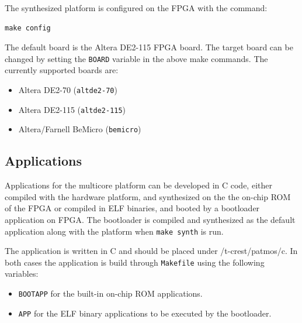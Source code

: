 \documentclass[a4paper,fontsize=10pt,twoside,DIV15,BCOR12mm,headinclude=true,footinclude=false,pagesize,bibtotoc]{scrbook}
\newcommand{\code}[1]{{\texttt{#1}}}
\begin{document}
The synthesized platform is configured on the FPGA with the command:

\begin{verbatim}
make config
\end{verbatim}

The default board is the Altera DE2-115 FPGA board. The target board can be changed by
setting the \code{BOARD} variable in the above make commands. The currently supported boards are:

\begin{itemize}
\item Altera DE2-70 (\code{altde2-70})
\item Altera DE2-115 (\code{altde2-115})
\item Altera/Farnell BeMicro (\code{bemicro})
\end{itemize}


\subsection{Applications}

Applications for the multicore platform can be developed in C code, either 
compiled with the hardware platform, and synthesized on the the on-chip ROM of the FPGA
or compiled in ELF binaries, and booted by a bootloader application on FPGA.
The bootloader is compiled and synthesized as the default application 
along with the platform when \code{make synth} is run.


The application is written in C and should be placed under /t-crest/patmos/c.
In both cases the application is build through \code{Makefile} using the following variables:

\begin{itemize}
\item \code{BOOTAPP} for the built-in on-chip ROM applications.
\item \code{APP} for the ELF binary applications to be executed by the bootloader.
\end{itemize}

%
\end{document}
